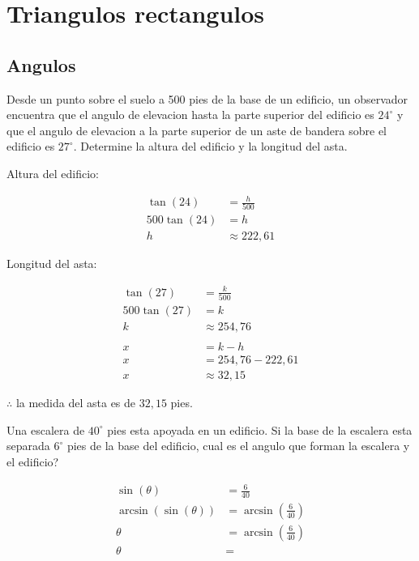 \chapter{Triangulos rectangulos}

\section{Angulos}


 {
    Desde un punto sobre el suelo a 500 pies de la base de un edificio,
    un observador encuentra que el angulo de elevacion hasta la parte 
    superior del edificio es $24^\circ$ y que el angulo de elevacion a la parte 
    superior de un aste de bandera sobre el edificio es $27^\circ$. Determine la 
    altura del edificio y la longitud del asta.
}

 {
    Altura del edificio:

    \[
        \begin{aligned}
            \tan(24) &= \frac{h}{500} \\
            500\tan(24) &= h \\
            h &\approx 222,61
        \end{aligned}
    \]

    Longitud del asta:

    \[
        \begin{aligned}
            \tan(27) &= \frac{k}{500} \\
            500\tan(27) &= k \\
            k &\approx 254,76 \\
            \\
            x &= k-h \\ 
            x &= 254,76 - 222,61 \\
            x &\approx 32,15
        \end{aligned}
    \]

    $\therefore$ la medida del asta es de $32,15$ pies.
}

 {
    Una escalera de $40^\circ$ pies esta apoyada en un edificio. Si la base 
    de la escalera esta separada $6^\circ$ pies de la base del edificio, cual
    es el angulo que forman la escalera y el edificio?
}

 {
    \[
        \begin{aligned}
            \sin(\theta) &= \frac{6}{40} \\
            \arcsin(\sin(\theta)) &= \arcsin(\frac{6}{40}) \\
            \theta &= \arcsin(\frac{6}{40}) \\
            \theta &= 
        \end{aligned}
    \]
}

